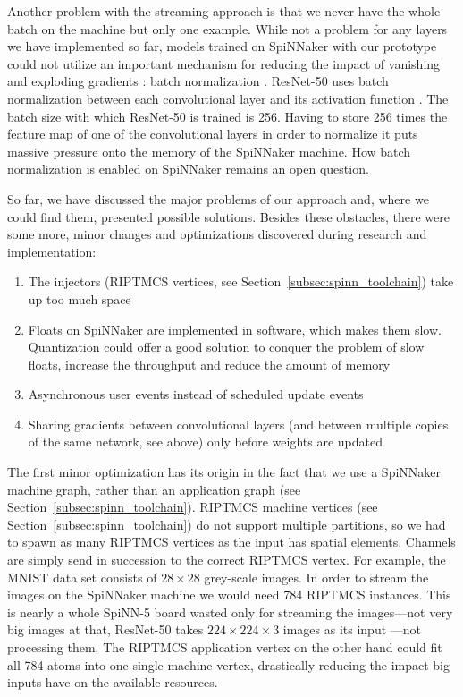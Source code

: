 \documentclass[]{article}
\begin{document}
Another problem with the streaming approach is that we never have the
whole batch on the machine but only one example.
While not a problem for any layers we have implemented so far,
models trained on SpiNNaker with our prototype could not utilize an
important mechanism for reducing the impact of vanishing and exploding
gradients \citep{bengio_et_al_1994, glorot_et_al_2010,
  brownlee_2019a}: batch normalization \citep{ioffe_et_al_2015}.
ResNet-50 uses batch normalization between each convolutional layer
and its activation function \citep{he_et_al_2015}.
The batch size with which ResNet-50 is trained is 256.
Having to store 256 times the feature map of one of the convolutional
layers in order to normalize it puts massive pressure onto the memory
of the SpiNNaker machine.
How batch normalization is enabled on SpiNNaker remains an open
question.

So far, we have discussed the major problems of our approach and,
where we could find them, presented possible solutions.
Besides these obstacles, there were some more, minor changes and
optimizations discovered during research and implementation:
\begin{enumerate}
  \item The injectors (RIPTMCS vertices, see
    Section~\ref{subsec:spinn_toolchain}) take up too much space
  \item Floats on SpiNNaker are implemented in software, which makes
    them slow. Quantization \citep{praveen_2020} could offer a good
    solution to conquer the problem of slow floats, increase the
    throughput and reduce the amount of memory
  \item Asynchronous user events instead of scheduled update events
  \item Sharing gradients between convolutional layers (and between
    multiple copies of the same network, see above) only before
    weights are updated
\end{enumerate}

The first minor optimization has its origin in the fact that we use
a SpiNNaker machine graph, rather than an application graph (see
Section~\ref{subsec:spinn_toolchain}).
RIPTMCS machine vertices (see Section~\ref{subsec:spinn_toolchain}) do
not support multiple partitions, so we had to spawn as many RIPTMCS
vertices as the input has spatial elements.
Channels are simply send in succession to the correct RIPTMCS vertex.
For example, the MNIST data set \citep{lecun_et_al_2020} consists of
$28 \times 28$ grey-scale images.
In order to stream the images on the SpiNNaker machine we would need
784 RIPTMCS instances.
This is nearly a whole SpiNN-5 board wasted only for streaming the
images---not very big images at that, ResNet-50 takes
$224 \times 224 \times 3$ images as its input
\citep{he_et_al_2015}---not processing them.
The RIPTMCS application vertex on the other hand could fit all 784
atoms into one single machine vertex, drastically reducing the impact
big inputs have on the available resources.
\end{document}
